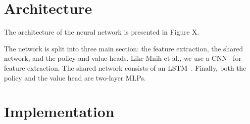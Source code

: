 


\section{Architecture}



The architecture of the neural network is presented in Figure X.

The network is split into three main section: the feature extraction, the shared network, and the policy and value heads.
Like Mnih et al., we use a CNN~\cite{} for feature extraction.
The shared network consists of an LSTM~\cite{hochreiter}.
Finally, both the policy and the value head are two-layer MLPs.




\section{Implementation}

